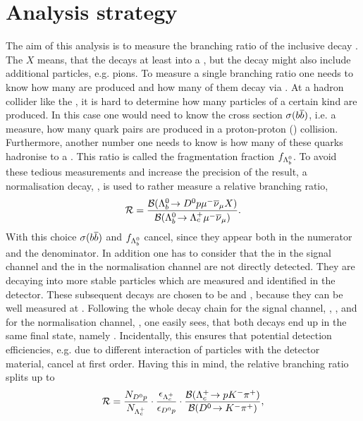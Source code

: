 \chapter{Analysis strategy}
\label{sec:Strategy}
The aim of this analysis is to measure the branching ratio of the inclusive decay \LbToDpmunuX.
The $X$ means, that the \Lb decays at least into a \Dz\proton\mun\neumb, but the decay might also include additional particles, e.g. pions.
To measure a single branching ratio one needs to know how many \Lb are produced and how many of them decay via \LbToDpmunu.
At a hadron collider like the \lhc, it is hard to determine how many particles of a certain kind are produced.
In this case one would need to know the \bquark\bquarkbar cross section $\sigma({b}{\overline {{b}}})$, i.e. a measure, how many \bquark\bquarkbar quark pairs are produced in a proton-proton (\proton\proton) collision.
Furthermore, another number one needs to know is how many of these \bquark quarks hadronise to a \Lb.
This ratio is called the fragmentation fraction $f_{{{\Lambda}^0_{b}}}$.
To avoid these tedious measurements and increase the precision of the result, a normalisation decay, \LbToLcmunu, is used to rather measure a relative branching ratio,
\begin{align}
	\mathcal{R} =
	\frac{{\cal B}({{\Lambda}^0_{b}}\!\rightarrow {\ensuremath{{D}^0}}{\ensuremath{p}} {\ensuremath{\mu^-}} {\ensuremath{{\overline{\nu}}_\mu}} X)}{{\cal B}({{\Lambda}^0_{b}}\!\rightarrow {\ensuremath{{\Lambda}^+_{c}}} {\ensuremath{\mu^-}}{\ensuremath{{\overline{\nu}}_\mu}})}. \label{eq:R_def}
\end{align}
With this choice $\sigma({b}{\overline {{b}}})$ and $f_{{{\Lambda}^0_{b}}}$ cancel, since they appear both in the numerator and the denominator.
In addition one has to consider that the \Dz in the signal channel and the \Lc in the normalisation channel are not directly detected.
They are decaying into more stable particles which are measured and identified in the detector.
These subsequent decays are chosen to be \DToKpi and \LcTopKpi, because they can be well measured at \lhcb.
Following the whole decay chain for the signal channel, \LbToDpmunuX, \DToKpi, and for the normalisation channel, \LbToLcmunu, \LcTopKpi one easily sees, that both decays end up in the same final state, namely \pKpi\mun\neumb.
Incidentally, this ensures that potential detection efficiencies, e.g. due to different interaction of particles with the detector material, cancel at first order.
Having this in mind, the relative branching ratio splits up to
\begin{align}
	\mathcal{R} =
	 \frac{N_{{{D}^0}{p}}}{N_{{{\Lambda}^+_{c}}}}  
	 \cdot \frac{\epsilon_{{{\Lambda}^+_{c}}}}{\epsilon_{{{D}^0}{p}}}
	 \cdot \frac{{\cal B}({{\Lambda}^+_{c}}\!\rightarrow p {{K}^-} {{\pi}^+})}{{\cal B}({{D}^0}\!\rightarrow {\ensuremath{{K}^-}}{\ensuremath{{\pi}^+}})}, \label{eq:R}
\end{align}
